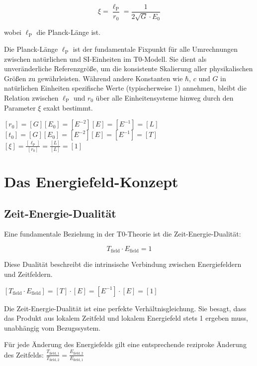 \documentclass[12pt,a4paper]{article}
\newcommand{\tfield}{T_{\text{field}}}
\newcommand{\efield}{E_{\text{field}}}
\newcommand{\lp}{\ell_{\text{P}}}
\theoremstyle{definition}
\begin{document}
	\begin{equation}
		\xi = \frac{\lp}{r_0} = \frac{1}{2\sqrt{G} \cdot E_0}
	\end{equation}
	
	wobei $\lp$ die Planck-Länge ist.
	
	\begin{wichtig}
		Die Planck-Länge $\lp$ ist der fundamentale Fixpunkt für alle Umrechnungen zwischen natürlichen und SI-Einheiten im T0-Modell. Sie dient als unveränderliche Referenzgröße, um die konsistente Skalierung aller physikalischen Größen zu gewährleisten. Während andere Konstanten wie $\hbar$, $c$ und $G$ in natürlichen Einheiten spezifische Werte (typischerweise 1) annehmen, bleibt die Relation zwischen $\lp$ und $r_0$ über alle Einheitensysteme hinweg durch den Parameter $\xi$ exakt bestimmt.
	\end{wichtig}
	
	\begin{einheitencheck}
		$[r_0] = [G][E_0] = [E^{-2}][E] = [E^{-1}] = [L]$ \checkmark\\
		$[t_0] = [G][E_0] = [E^{-2}][E] = [E^{-1}] = [T]$ \checkmark\\
		$[\xi] = \frac{[\lp]}{[r_0]} = \frac{[L]}{[L]} = [1]$ \checkmark
	\end{einheitencheck}
	
	\section{Das Energiefeld-Konzept}
	
	\subsection{Zeit-Energie-Dualität}
	
	Eine fundamentale Beziehung in der T0-Theorie ist die Zeit-Energie-Dualität:
	
	\begin{equation}
		\boxed{\tfield \cdot \efield = 1}
	\end{equation}
	
	Diese Dualität beschreibt die intrinsische Verbindung zwischen Energiefeldern und Zeitfeldern.
	
	\begin{einheitencheck}
		$[\tfield \cdot \efield] = [T] \cdot [E] = [E^{-1}] \cdot [E] = [1]$ \checkmark
	\end{einheitencheck}
	
	\begin{verhaltnis}
		Die Zeit-Energie-Dualität ist eine perfekte Verhältnisgleichung. Sie besagt, dass das Produkt aus lokalem Zeitfeld und lokalem Energiefeld stets 1 ergeben muss, unabhängig vom Bezugssystem.
		
		Für jede Änderung des Energiefelds gilt eine entsprechende reziproke Änderung des Zeitfelds:
		$\frac{T_{\text{field},1}}{T_{\text{field},2}} = \frac{E_{\text{field},2}}{E_{\text{field},1}}$
	\end{verhaltnis}
	
\end{document}

